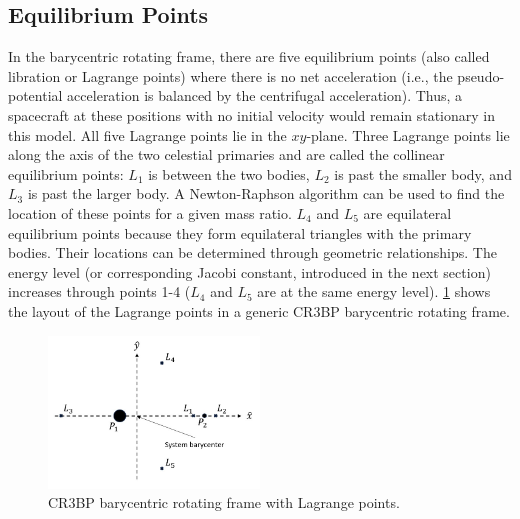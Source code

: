 \subsection{Equilibrium Points}
In the barycentric rotating frame, there are five equilibrium points (also called libration or
Lagrange points) where there is no net acceleration (i.e., the pseudo-potential acceleration is
balanced by the centrifugal acceleration). Thus, a spacecraft at these positions with no initial
velocity would remain stationary in this model. All five Lagrange points lie in the $xy$-plane.
Three Lagrange points lie along the axis of the two celestial primaries and are called the
collinear equilibrium points: $L_{1}$ is between the two bodies, $L_{2}$ is past the smaller body,
and $L_{3}$ is past the larger body. A Newton-Raphson algorithm can be used to find the location of
these points for a given mass ratio. $L_{4}$ and $L_{5}$ are equilateral equilibrium points because
they form equilateral triangles with the primary bodies. Their locations can be determined through
geometric relationships. The energy level (or corresponding Jacobi constant, introduced in the next
section) increases through points 1-4 ($L_{4}$ and $L_{5}$ are at the same energy level).
\cref{fig:rotFrame} shows the layout of the Lagrange points in a generic CR3BP barycentric rotating
frame.

\begin{figure}[ht]
    \centering
    \includegraphics[width=0.5\textwidth]{figures/RotFrame.jpg}
    \caption{CR3BP barycentric rotating frame with Lagrange points.}
    \label{fig:rotFrame}
\end{figure}

